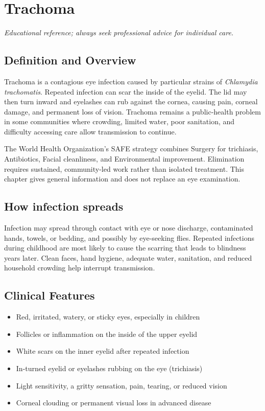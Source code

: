 \chapter{Trachoma}
\medskip
\noindent\textit{Educational reference; always seek professional advice for individual care.}

\section*{Definition and Overview}
Trachoma is a contagious eye infection caused by particular strains of \textit{Chlamydia trachomatis}. Repeated infection can scar the inside of the eyelid. The lid may then turn inward and eyelashes can rub against the cornea, causing pain, corneal damage, and permanent loss of vision. Trachoma remains a public-health problem in some communities where crowding, limited water, poor sanitation, and difficulty accessing care allow transmission to continue.

The World Health Organization's SAFE strategy combines Surgery for trichiasis, Antibiotics, Facial cleanliness, and Environmental improvement. Elimination requires sustained, community-led work rather than isolated treatment. This chapter gives general information and does not replace an eye examination.

\section*{How infection spreads}
Infection may spread through contact with eye or nose discharge, contaminated hands, towels, or bedding, and possibly by eye-seeking flies. Repeated infections during childhood are most likely to cause the scarring that leads to blindness years later. Clean faces, hand hygiene, adequate water, sanitation, and reduced household crowding help interrupt transmission.

\section*{Clinical Features}
\begin{itemize}
    \item Red, irritated, watery, or sticky eyes, especially in children
    \item Follicles or inflammation on the inside of the upper eyelid
    \item White scars on the inner eyelid after repeated infection
    \item In-turned eyelid or eyelashes rubbing on the eye (trichiasis)
    \item Light sensitivity, a gritty sensation, pain, tearing, or reduced vision
    \item Corneal clouding or permanent visual loss in advanced disease
\end{itemize}

